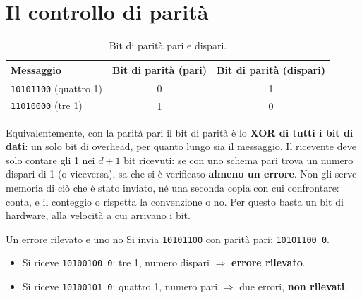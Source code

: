 \section{Il controllo di parità}


\begin{table}[H]
\centering
\begin{tabular}{lcc}
\toprule
\textbf{Messaggio} & \textbf{Bit di parità (pari)} & \textbf{Bit di parità (dispari)} \\
\midrule
\texttt{10101100} (quattro 1) & 0 & 1 \\
\texttt{11010000} (tre 1) & 1 & 0 \\
\bottomrule
\end{tabular}
\caption{Bit di parità pari e dispari.}
\end{table}

Equivalentemente, con la parità pari il bit di parità è lo \textbf{XOR di tutti i bit di dati}: un solo bit di overhead, per
quanto lungo sia il messaggio. Il ricevente deve solo contare gli 1 nei $d+1$ bit ricevuti: se con uno schema pari trova un numero
dispari di 1 (o viceversa), sa che si è verificato \textbf{almeno un errore}. Non gli serve memoria di ciò che è stato inviato, né una
seconda copia con cui confrontare: conta, e il conteggio o rispetta la convenzione o no. Per questo basta un bit di hardware, alla
velocità a cui arrivano i bit.

\begin{esempio}{Un errore rilevato e uno no}
Si invia \texttt{10101100} con parità pari: \texttt{10101100 0}.
\begin{itemize}
    \item Si riceve \texttt{1010\textcolor{netred}{0}100 0}: tre 1, numero dispari $\Rightarrow$ \textbf{errore rilevato}.
    \item Si riceve \texttt{1010\textcolor{netred}{0}10\textcolor{netred}{1} 0}: quattro 1, numero pari $\Rightarrow$ due errori, \textbf{non rilevati}.
\end{itemize}
\end{esempio}

